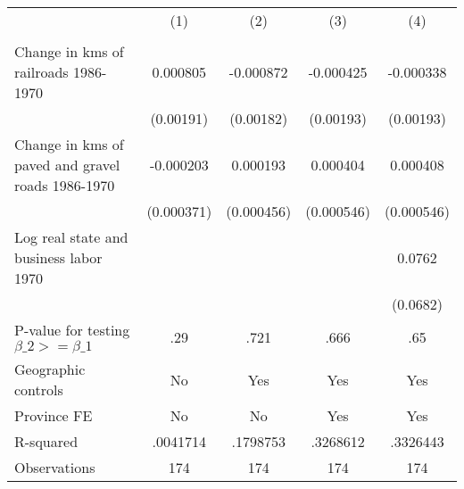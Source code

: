 {
\def\sym#1{\ifmmode^{#1}\else\(^{#1}\)\fi}
\begin{tabular}{l*{4}{c}}
\hline\hline
                &\multicolumn{1}{c}{(1)}&\multicolumn{1}{c}{(2)}&\multicolumn{1}{c}{(3)}&\multicolumn{1}{c}{(4)}\\
                &\multicolumn{1}{c}{}&\multicolumn{1}{c}{}&\multicolumn{1}{c}{}&\multicolumn{1}{c}{}\\
\hline
Change in kms of railroads 1986-1970& 0.000805         &-0.000872         &-0.000425         &-0.000338         \\
                &(0.00191)         &(0.00182)         &(0.00193)         &(0.00193)         \\
[1em]
Change in kms of paved and gravel roads 1986-1970&-0.000203         & 0.000193         & 0.000404         & 0.000408         \\
                &(0.000371)         &(0.000456)         &(0.000546)         &(0.000546)         \\
[1em]
Log real state and business labor 1970&                  &                  &                  &   0.0762         \\
                &                  &                  &                  & (0.0682)         \\
\hline
P-value for testing $\beta\_{2} >= \beta\_{1}$&      .29         &     .721         &     .666         &      .65         \\
Geographic controls&       No         &      Yes         &      Yes         &      Yes         \\
Province FE     &       No         &       No         &      Yes         &      Yes         \\
R-squared       & .0041714         & .1798753         & .3268612         & .3326443         \\
Observations    &      174         &      174         &      174         &      174         \\
\hline\hline
\end{tabular}
}
